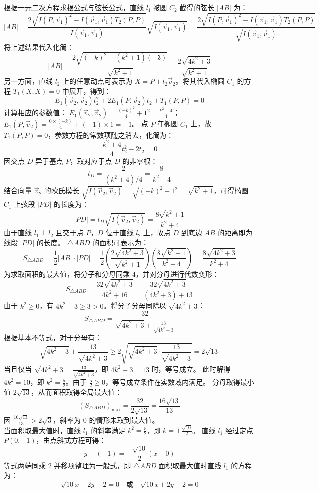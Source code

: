 \begin{solution}
根据一元二次方程求根公式与弦长公式，直线 $l_1$ 被圆 $C_2$ 截得的弦长 $|AB|$ 为：
$$ |AB| = \frac{2\sqrt{I(P, \vec{v}_1)^2 - I(\vec{v}_1, \vec{v}_1)T_2(P, P)}}{I(\vec{v}_1, \vec{v}_1)} \sqrt{I(\vec{v}_1, \vec{v}_1)} = \frac{2\sqrt{I(P, \vec{v}_1)^2 - I(\vec{v}_1, \vec{v}_1)T_2(P, P)}}{\sqrt{I(\vec{v}_1, \vec{v}_1)}} $$
将上述结果代入化简：
$$ |AB| = \frac{2\sqrt{(-k)^2 - (k^2 + 1)(-3)}}{\sqrt{k^2 + 1}} = \frac{2\sqrt{4k^2 + 3}}{\sqrt{k^2 + 1}} $$
另一方面，直线 $l_2$ 上的任意动点可表示为 $X = P + t_2\vec{v}_2$。将其代入椭圆 $C_1$ 的方程 $T_1(X, X) = 0$ 中展开，得到：
$$ E_1(\vec{v}_2, \vec{v}_2)t_2^2 + 2E_1(P, \vec{v}_2)t_2 + T_1(P, P) = 0 $$
计算相应的参数值：
$E_1(\vec{v}_2, \vec{v}_2) = \frac{(-k)^2}{4} + 1^2 = \frac{k^2 + 4}{4}$；
$E_1(P, \vec{v}_2) = \frac{0 \times (-k)}{4} + (-1) \times 1 = -1$。
点 $P$ 在椭圆 $C_1$ 上，故 $T_1(P, P) = 0$，参数方程的常数项随之消去，化简为：
$$ \frac{k^2 + 4}{4}t_2^2 - 2t_2 = 0 $$
因交点 $D$ 异于基点 $P$，取对应于点 $D$ 的非零根：
$$ t_D = \frac{2}{(k^2 + 4) / 4} = \frac{8}{k^2 + 4} $$
结合向量 $\vec{v}_2$ 的欧氏模长 $\sqrt{I(\vec{v}_2, \vec{v}_2)} = \sqrt{(-k)^2 + 1^2} = \sqrt{k^2 + 1}$，可得椭圆 $C_1$ 上弦段 $|PD|$ 的长度为：
$$ |PD| = t_D \sqrt{I(\vec{v}_2, \vec{v}_2)} = \frac{8\sqrt{k^2 + 1}}{k^2 + 4} $$
由于直线 $l_1 \perp l_2$ 且交于点 $P$，$D$ 位于直线 $l_2$ 上，故点 $D$ 到底边 $AB$ 的距离即为线段 $|PD|$ 的长度。
$\triangle ABD$ 的面积可表示为：
$$ S_{\triangle ABD} = \frac{1}{2} |AB| \cdot |PD| = \frac{1}{2} \left( \frac{2\sqrt{4k^2 + 3}}{\sqrt{k^2 + 1}} \right) \left( \frac{8\sqrt{k^2 + 1}}{k^2 + 4} \right) = \frac{8\sqrt{4k^2 + 3}}{k^2 + 4} $$
为求取面积的最大值，将分子和分母同乘 $4$，并对分母进行代数变形：
$$ S_{\triangle ABD} = \frac{32\sqrt{4k^2 + 3}}{4k^2 + 16} = \frac{32\sqrt{4k^2 + 3}}{(4k^2 + 3) + 13} $$
由于 $k^2 \ge 0$，有 $4k^2 + 3 \ge 3 > 0$。将分子分母同除以 $\sqrt{4k^2 + 3}$：
$$ S_{\triangle ABD} = \frac{32}{\sqrt{4k^2 + 3} + \frac{13}{\sqrt{4k^2 + 3}}} $$
根据基本不等式，对于分母有：
$$ \sqrt{4k^2 + 3} + \frac{13}{\sqrt{4k^2 + 3}} \ge 2\sqrt{ \sqrt{4k^2 + 3} \cdot \frac{13}{\sqrt{4k^2 + 3}} } = 2\sqrt{13} $$
当且仅当 $\sqrt{4k^2 + 3} = \frac{13}{\sqrt{4k^2 + 3}}$，即 $4k^2 + 3 = 13$ 时，等号成立。
此时解得 $4k^2 = 10$，即 $k^2 = \frac{5}{2}$。由于 $\frac{5}{2} \ge 0$，等号成立条件在实数域内满足。
分母取得最小值 $2\sqrt{13}$，从而面积取得全局最大值：
$$ (S_{\triangle ABD})_{\max} = \frac{32}{2\sqrt{13}} = \frac{16\sqrt{13}}{13} $$
因 $\frac{16\sqrt{13}}{13} > 2\sqrt{3}$，斜率为 $0$ 的情形未取到最大值。\\
当面积取最大值时，直线 $l_1$ 的斜率满足 $k^2 = \frac{5}{2}$，即 $k = \pm\frac{\sqrt{10}}{2}$。
直线 $l_1$ 经过定点 $P(0, -1)$，由点斜式方程可得：
$$ y - (-1) = \pm\frac{\sqrt{10}}{2}(x - 0) $$
等式两端同乘 $2$ 并移项整理为一般式，即 $\triangle ABD$ 面积取最大值时直线 $l_1$ 的方程为：
$$ \sqrt{10}x - 2y - 2 = 0 \quad \text{或} \quad \sqrt{10}x + 2y + 2 = 0 $$

\end{solution}







